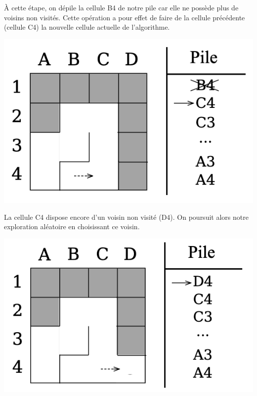 \begin{minipage}{0.6\textwidth}
À cette étape, on dépile la cellule B4 de notre pile car elle ne possède plus de voisins non visités. Cette opération a pour effet de faire de la cellule précédente (cellule C4) la nouvelle cellule actuelle de l'algorithme.
\end{minipage}
\begin{minipage}{0.4\textwidth}
\includegraphics[width=\linewidth]{pics/backtracking5.png}
\end{minipage}

\begin{minipage}{0.6\textwidth}
La cellule C4 dispose encore d'un voisin non visité (D4). On poursuit alors notre exploration aléatoire en choisissant ce voisin.
\end{minipage}
\begin{minipage}{0.4\textwidth}
\includegraphics[width=\linewidth]{pics/backtracking6.png}
\end{minipage}

